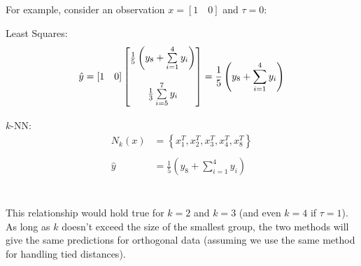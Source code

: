 \documentclass[a4paper]{article}
\begin{document}
For example, consider an observation $x=[1 \quad 0]$ and $\tau=0$:\\

\begin{minipage}[t]{0.45\linewidth}
Least Squares:
\begin{align*}
  \hat{y} &= [1\quad0] \begin{bmatrix}
      \frac{1}{5}\left(y_8+\sum\limits_{i=1}^4 y_i\right)\\\\
      \frac{1}{3}\sum\limits_{i=5}^7 y_i\vspace{2pt}
    \end{bmatrix}
    = \frac{1}{5}\left(y_8+\sum\limits_{i=1}^4 y_i\right)\\
\end{align*}
\end{minipage}
\hfill
\vline
\hfill
\begin{minipage}[t]{0.45\linewidth}
$k$-NN:
\begin{align*}
N_k(x) &= \left\{x_1^T, x_2^T, x_3^T, x_4^T, x_8^T\right\}\\\\
\hat{y} &= \frac{1}{5}\left(y_8+\sum\limits_{i=1}^4 y_i\right)\\
\end{align*}
\end{minipage}\\

This relationship would hold true for $k=2$ and $k=3$ (and even $k=4$ if $\tau=1$).
As long as $k$ doesn't exceed the size of the smallest group, the two methods
will give the same predictions for orthogonal data (assuming we use the same method
for handling tied distances).\\
\end{document}
